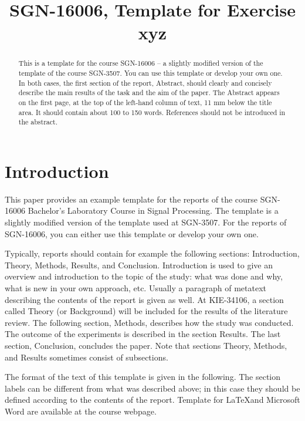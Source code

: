 \documentclass{article}
\title{ SGN-16006, Template for Exercise xyz}
\begin{document}
\maketitle
\sloppy

\begin{abstract}
This is a template for the course SGN-16006 -- a slightly modified version of the template of the course SGN-3507. You can use this template or develop your own one. In both cases, the first section of the report, Abstract, should clearly and concisely describe the main results of the task and the aim of the paper. The Abstract appears on the first page, at the top of the left-hand column of text, 11 mm below the title area. It should contain about 100 to 150 words. References should not be introduced in the abstract.
\end{abstract}

\section{Introduction}
\label{sec:intro}
This paper provides an example template for the reports of the course SGN-16006 Bachelor's Laboratory Course in Signal Processing. The template is a slightly modified version of the template used at SGN-3507. For the reports of SGN-16006, you can either use this template or develop your own one.

Typically, reports should contain for example the following sections: Introduction, Theory, Methods, Results, and Conclusion. Introduction is used to give an overview and introduction to the topic of the study: what was done and why, what is new in your own approach, etc. Usually a paragraph of metatext describing the contents of the report is given as well. At KIE-34106, a section called Theory (or Background) will be included for the results of the literature review. The following section, Methods, describes how the study was conducted. The outcome of the experiments is described in the section Results. The last section, Conclusion, concludes the paper. Note that sections Theory, Methods, and Results sometimes consist of subsections.

The format of the text of this template is given in the following. The section labels can be different from what was described above; in this case they should be defined according to the contents of the report. Template for \LaTeX and Microsoft Word are available at the course webpage.
\end{document}
